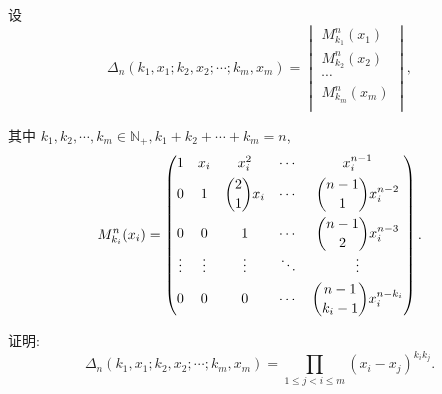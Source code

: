 \documentclass{ctexart}
\begin{document}
\begin{exercise}%
    设
    \[\Delta_n(k_1,x_1;k_2,x_2;\cdots;k_m,x_m)=\begin{vmatrix}
        M_{k_1}^n(x_1) \\
        M_{k_2}^n(x_2) \\
        \cdots \\
        M_{k_m}^n(x_m) \\
    \end{vmatrix},\]

    其中 $k_1,k_2,\cdots,k_m\in\mathbb{N}_+,k_1+k_2+\cdots+k_m=n$,
    \[M_{k_i}^n(x_i)=\begin{pmatrix}
        1 & x_i & x_i^2 & \cdots & x_i^{n-1} \\[4pt]
        0 & 1 & \dbinom{2}{1}x_i & \cdots & \dbinom{n-1}{1}x_i^{n-2} \\[10pt]
        0 & 0 & 1 & \cdots & \dbinom{n-1}{2}x_i^{n-3} \\
        \vdots & \vdots & \vdots & \ddots & \vdots \\[4pt]
        0 & 0 & 0 & \cdots & \dbinom{n-1}{k_i-1}x_i^{n-k_i} \\
    \end{pmatrix}.\]

    证明:
    \[\Delta_n(k_1,x_1;k_2,x_2;\cdots;k_m,x_m)=\prod\limits_{1\leq j<i\leq m}(x_i-x_j)^{k_ik_j}.\]
\end{exercise}
\end{document}
